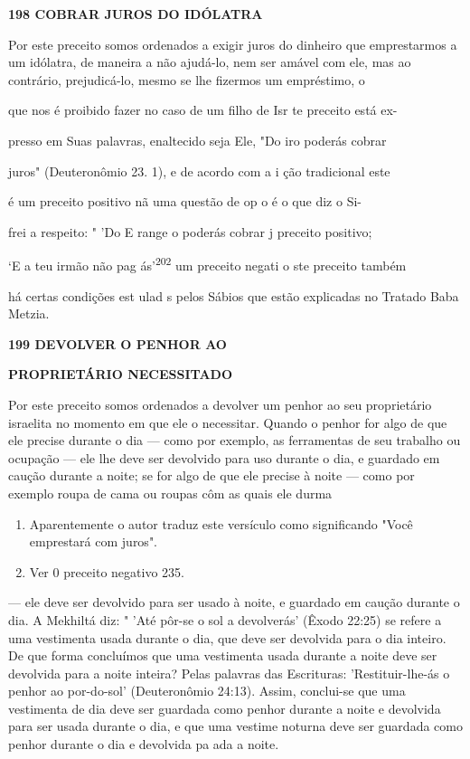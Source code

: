 \textbf{198 COBRAR JUROS DO IDÓLATRA}

Por este preceito somos ordenados a exigir juros do dinheiro que
emprestarmos a um idólatra, de maneira a não ajudá-lo, nem ser amável
com ele, mas ao contrário, prejudicá-lo, mesmo se lhe fizermos um
empréstimo, o

que nos é proibido fazer no caso de um filho de Isr te preceito está ex-

presso em Suas palavras, enaltecido seja Ele, "Do iro poderás cobrar

juros" (Deuteronômio 23. 1), e de acordo com a i ção tradicional este

é um preceito positivo nã uma questão de op o é o que diz o Si-

frei a respeito: " 'Do E range o poderás cobrar j preceito positivo;

`E a teu irmão não pag ás'\textsuperscript{202} um preceito negati o ste
preceito também

há certas condições est ulad s pelos Sábios que estão explicadas no
Tratado Baba Metzia.

\textbf{199 DEVOLVER O PENHOR AO}

\textbf{PROPRIETÁRIO NECESSITADO}

Por este preceito somos ordenados a devolver um penhor ao seu
proprietário israelita no momento em que ele o necessitar. Quando o
penhor for algo de que ele precise durante o dia --- como por exemplo,
as ferramentas de seu trabalho ou ocupação --- ele lhe deve ser
devolvido para uso durante o dia, e guardado em caução durante a noite;
se for algo de que ele precise à noite --- como por exemplo roupa de
cama ou roupas côm as quais ele durma


\begin{enumerate}
\def\labelenumi{\arabic{enumi}.}
\setcounter{enumi}{200}
\item
 
 Aparentemente o autor traduz este versículo como significando "Você
 emprestará com juros".
 
\item
 
 Ver 0 preceito negativo 235.
 
\end{enumerate}




--- ele deve ser devolvido para ser usado à noite, e guardado em caução
duran­te o dia. A Mekhiltá diz: " 'Até pôr-se o sol a devolverás' (Êxodo
22:25) se refe­re a uma vestimenta usada durante o dia, que deve ser
devolvida para o dia inteiro. De que forma concluímos que uma vestimenta
usada durante a noite deve ser devolvida para a noite inteira? Pelas
palavras das Escrituras: 'Restituir-lhe-ás o penhor ao por-do-sol'
(Deuteronômio 24:13). Assim, conclui-se que uma vestimenta de dia deve
ser guardada como penhor durante a noite e de­volvida para ser usada
durante o dia, e que uma vestime noturna deve ser guardada como penhor
durante o dia e devolvida pa ada a noite.


